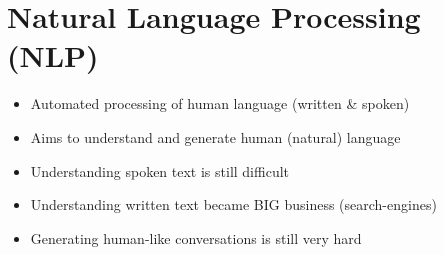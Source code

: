 \section{Natural Language Processing (NLP)}
\begin{itemize}
    \item Automated processing of human language (written \& spoken)
    \item Aims to understand and generate human (natural) language
    \item Understanding spoken text is still difficult
    \item Understanding written text became BIG business (search-engines)
    \item Generating human-like conversations is still very hard
\end{itemize}

